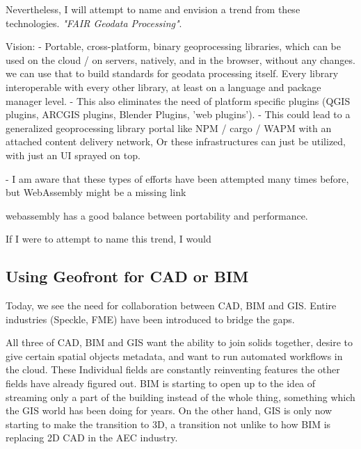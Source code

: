 Nevertheless, I will attempt to name and envision a trend from these technologies. \emph{"FAIR Geodata Processing"}.

Vision: 
- Portable, cross-platform, binary geoprocessing libraries, which can be used on the cloud / on servers, natively, and in the browser, without any changes. 
\m{->} we can use that to build standards for geodata processing itself. Every  library interoperable with every other library, at least on a language and package manager level.
- This also eliminates the need of platform specific plugins (QGIS plugins, ARCGIS plugins, Blender Plugins, 'web plugins').
- This could lead to a generalized geoprocessing library portal like NPM / cargo / WAPM with an attached content delivery network, Or these infrastructures can just be utilized, with just an UI sprayed on top.

- I am aware that these types of efforts have been attempted many times before, but WebAssembly might be a missing link 

\m{->} webassembly has a good balance between portability and performance.

\m{->}

If I were to attempt to name this trend, I would

\subsection{Using Geofront for CAD or  BIM}


Today, we see the need for collaboration between CAD, BIM and GIS. Entire industries (Speckle, FME) have been introduced to bridge the gaps. 

All three of CAD, BIM and GIS want the ability to join solids together, desire to give certain spatial objects metadata, and want to run automated workflows in the cloud. These Individual fields are constantly reinventing features the other fields have already figured out. BIM is starting to open up to the idea of streaming only a part of the building instead of the whole thing, something which the GIS world has been doing for years. On the other hand, GIS is only now starting to make the transition to 3D, a transition not unlike to how BIM is replacing 2D CAD in the AEC industry. 

